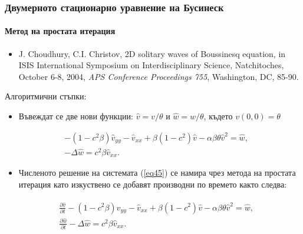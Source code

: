 \documentclass{beamer}
\newcommand{\rf}[1]{(\ref{#1})}
\begin{document}

\begin{frame}
\frametitle{Двумерното стационарно уравнение на Бусинеск}
\framesubtitle{Метод на простата итерация} 
\begin{itemize}
  \item  {\footnotesize J. Choudhury, C.I. Christov,
2D solitary waves of Boussinesq equation, in ISIS International Symposium on Interdisciplinary Science, Natchitoches, October 6-8, 2004, {\it APS Conference Proceedings 755}, Washington, DC, 85-90.}
\end{itemize}
Алгоритмични стъпки:
\begin{itemize}
  \item Въвеждат се две нови функции: $\widehat{v}=v/{\theta} $ и $\widehat{w}=w/{\theta} $, където $v(0,0)=\theta$
\end{itemize}
\begin{equation}\label{eq45}
\begin{split}
 &- (1 - c^2 \beta) \widehat{v}_{yy} -\widehat{v}_{xx} + \beta (1-c^2) \widehat{v} - \alpha \beta \theta \widehat{v}^2 = \widehat{w}, \\
 &- \Delta \widehat{w} =  c^2 \beta \widehat{v}_{xx}.
\end{split}
\end{equation}

\begin{itemize}
  \item Численото решение на системата \rf{eq45} се намира чрез метода на простата итерация като изкуствено се добавят производни по времето както следва:
\end{itemize}
\begin{align}\label{eq5}
\begin{split}
 &\frac {\partial \widehat{v}}{\partial t} - (1 - c^2 \beta) \widehat{v}_{yy} -\widehat{v}_{xx} + \beta (1-c^2) \widehat{v} - \alpha \beta \theta \widehat{v}^2 = \widehat{w}, \\
 &\frac {\partial \widehat{w}}{\partial t} - \Delta \widehat{w} =  c^2 \beta \widehat{v}_{xx}. 
\end{split}
\end{align}



\end{frame}
\end{document}
